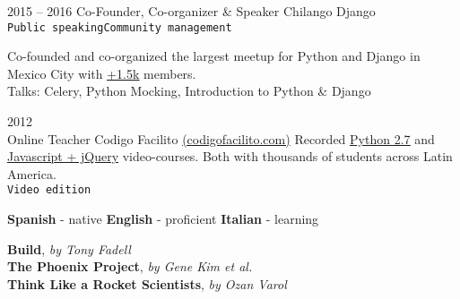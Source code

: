 \documentclass[9pt]{developercv} %
\begin{document}
\begin{entrylist}
    \entry
        {2015 -- 2016}
        {Co-Founder, Co-organizer \& Speaker}
        {
            Chilango Django \\
            \texttt{Public speaking}\slashsep\texttt{Community management}
        }
        {
            
            Co-founded and co-organized the largest meetup for Python and Django in 
            Mexico City with {\href{https://meetup.com/Chilango-Django/}{\underline{+1.5k}}} members. \\

            \small{Talks: Celery, Python Mocking, Introduction to Python \& Django}
            
        }
    \entry
        {2012\\\footnotesize{Online}}
        {Teacher}
        {Codigo Facilito {\href{(https://codigofacilito.com/}{(codigofacilito.com)}}}
        {
            Recorded 
            {\href{https://www.youtube.com/watch?v=CjmzDHMHxwU&list=PLE549A038CF82905F}{\underline{Python 2.7}}} 
            and {\href{https://www.youtube.com/watch?v=jKbjblt4NXA&list=PLpOqH6AE0tNi47LF-_6gddgq10lp_TLDB}{\underline{Javascript + jQuery}}} 
            video-courses. Both with thousands of students across Latin America.\\
            \texttt{Video edition}
        }
\end{entrylist}


\begin{minipage}[t]{1\textwidth}
    \vspace{-\baselineskip} %
    \textbf{Spanish} - native
    \slashsep\textbf{English} - proficient
    \slashsep\textbf{Italian} - learning
\end{minipage}




\begin{minipage}[t]{1\textwidth}
    \vspace{-\baselineskip} %
    \textbf{Build}, \textit{by Tony Fadell} \\
    \textbf{The Phoenix Project}, \textit{by Gene Kim et al.} \\
    \textbf{Think Like a Rocket Scientists}, \textit{by Ozan Varol} \\
\end{minipage}
\end{document}
